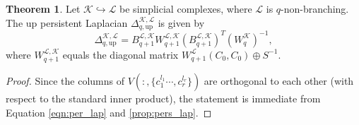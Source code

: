 \documentclass{article}
\theoremstyle{definition}
\newtheorem{theorem}{Theorem}[section]
\newcommand{\KK}{\mathcal{K}}
\newcommand{\LL}{\mathcal{L}}
\begin{document}
\begin{theorem}
    \label{thm:fastcomputation}
    Let $\KK \hookrightarrow \LL$ be simplicial complexes, where $\LL$ is $q$-non-branching. The up persistent Laplacian $\Delta_{q, \mathrm{up}}^{\KK, \LL}$ is given by 
    \begin{equation}\label{eq:uplap_1}
    \Delta_{q, \mathrm{up}}^{\KK, \LL}
    =
    B_{q+1}^{\LL, \KK} W_{q+1}^{\LL, \KK}\left(B_{q+1}^{\LL, \KK}\right)^{T}(W_{q}^\KK)^{-1},
    \end{equation}
    where $W_{q+1}^{\LL, \KK}$ equals the diagonal matrix $W_{q+1}^{\LL}(C_0, C_0) \oplus S^{-1}$.
\end{theorem}
\begin{proof}
    Since the columns of $V(:, \{c_1^{l_1}\cdots, c_r^{l_r}\})$ are orthogonal to each other (with respect to the standard inner product), the statement is immediate from Equation \eqref{eqn:per_lap} and \cref{prop:pers_lap}.

\end{proof}
\end{document}
